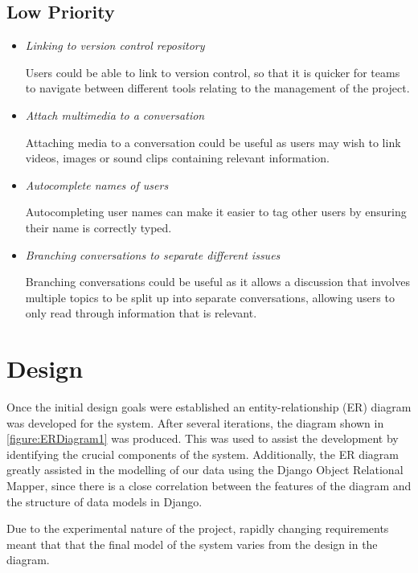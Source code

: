 \documentclass[a4paper]{l3proj}
\begin{document}
\subsection{Low Priority}
\begin{itemize}
\item \textit{Linking to version control repository} \par
Users could be able to link to version control, so that it is quicker for teams to navigate between different tools relating to the management of the project.

\item \textit{Attach multimedia to a conversation} \par
Attaching media to a conversation could be useful as users may wish to link videos, images or sound clips containing relevant information.

\item \textit{Autocomplete names of users} \par
Autocompleting user names can make it easier to tag other users by ensuring their name is correctly typed.

\item \textit{Branching conversations to separate different issues} \par
Branching conversations could be useful as it allows a discussion that involves multiple topics to be split up into separate conversations, allowing users to only read through information that is relevant.

\end{itemize}

\fi


\section{Design}
\label{design}

Once the initial design goals were established an entity-relationship (ER) diagram was developed for the system. After several iterations, the diagram shown in \autoref{figure:ERDiagram1} was produced. This was used to assist the development by identifying the crucial components of the system. Additionally, the ER diagram greatly assisted in the modelling of our data using the Django Object Relational Mapper, since there is a close correlation between the features of the diagram and the structure of data models in Django.

Due to the experimental nature of the project, rapidly changing requirements meant that that the final model of the system varies from the design in the diagram.
\end{document}
